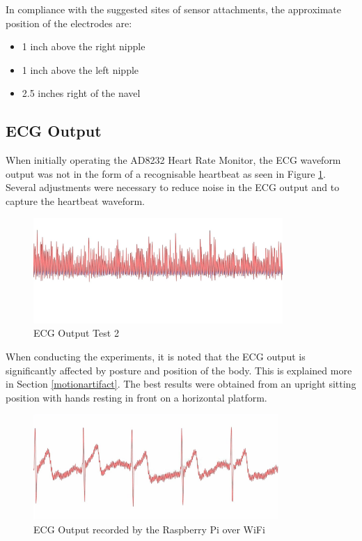 In compliance with the suggested sites of sensor attachments, the approximate position of the electrodes are: 

\begin{itemize}
	\item 1 inch above the right nipple
	\item 1 inch above the left nipple
	\item 2.5 inches right of the navel
\end{itemize}

\subsection{ECG Output}

When initially operating the AD8232 Heart Rate Monitor, the ECG waveform output was not in the form of a recognisable heartbeat as seen in Figure \ref{ecgtest2}. Several adjustments were necessary to reduce noise in the ECG output and to capture the heartbeat waveform. 

\begin{figure}[H]
	\centering
	\includegraphics[width=\linewidth,height=40mm,frame]{ecgtest2.jpg}
	\caption{ECG Output Test 2}
	\label{ecgtest2}
\end{figure} 

When conducting the experiments, it is noted that the ECG output is significantly affected by posture and position of the body. This is explained more in Section \ref{motionartifact}. The best results were obtained from an upright sitting position with hands resting in front on a horizontal platform. 

\begin{figure}[H]
	\centering
	\includegraphics[width=\linewidth,height=40mm,frame]{ecgtest19.jpg}
	\caption{ECG Output recorded by the Raspberry Pi over WiFi}
	\label{ecgoutput}
\end{figure} 

